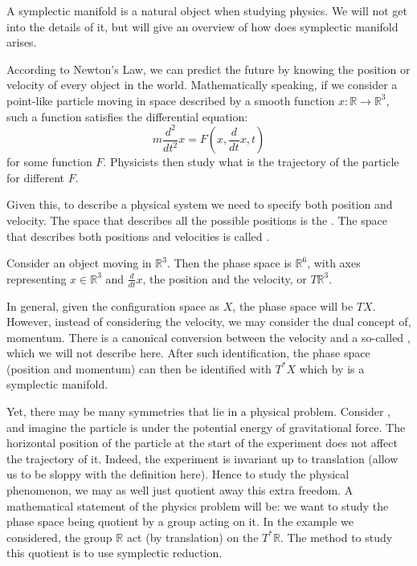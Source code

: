 \documentclass[b5paper,final]{article}
\begin{document}
A symplectic manifold is a natural object when studying physics.
We will not get into the details of it, but will give an overview of how does symplectic manifold arises.

According to Newton's Law, we can predict the future by knowing the position or velocity of every object in the world. Mathematically speaking, if we consider a point-like particle moving in space described by a smooth function $x:\mathbb{R}\rightarrow \mathbb{R}^3$, such a function satisfies the differential equation:
\[
  m\frac{d^2}{dt^2}x=F(x,\frac{d}{dt}x,t)
\]
for some function $F$. Physicists then study what is the trajectory of the particle for different $F$.

Given this, to describe a physical system we need to specify both position and velocity. The space that describes all the possible positions is the . The space that describes both positions and velocities is called .

\begin{example}{}
  Consider an object moving in $\mathbb{R}^3$. Then the phase space is $\mathbb{R}^6$, with axes representing $x\in \mathbb{R}^3$ and $\frac{d}{dt}x$, the position and the velocity, or $T\mathbb{R}^3$.
\end{example}

In general, given the configuration space as $X$, the phase space will be $TX$.
However, instead of considering the velocity, we may consider the dual concept of, momentum. There is a canonical conversion between the velocity and a so-called , which we will not describe here. After such identification, the phase space (position and momentum) can then be identified with $T^*X$ which by  is a symplectic manifold.

Yet, there may be many symmetries that lie in a physical problem. Consider , and imagine the particle is under the potential energy of gravitational force. The horizontal position of the particle at the start of the experiment does not affect the trajectory of it. Indeed, the experiment is invariant up to translation (allow us to be sloppy with the definition here). Hence to study the physical phenomenon, we may as well just quotient away this extra freedom. A mathematical statement of the physics problem will be: we want to study the phase space being quotient by a group acting on it. In the example we considered, the group $\mathbb{R}$ act (by translation) on the $T^*\mathbb{R}$. The method to study this quotient is to use symplectic reduction.
\end{document}
